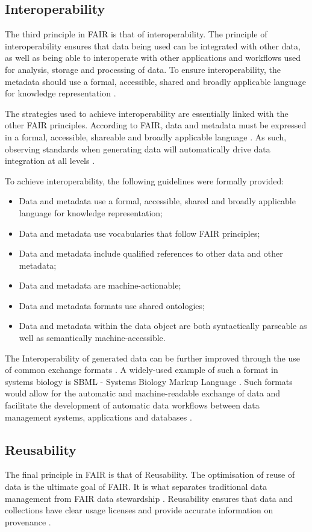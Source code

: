 \documentclass{cisfyp}
\begin{document}
\subsection{Interoperability}
The third principle in FAIR is that of interoperability. The principle of interoperability ensures that data being used can be integrated with other data, as well as being able to interoperate with other applications and workflows used for analysis, storage and processing of data. To ensure interoperability, the metadata should use a formal, accessible, shared and broadly applicable language for knowledge representation \cite{libereurope_2017}.

The strategies used to achieve interoperability are essentially linked with the other FAIR principles. According to FAIR, data and metadata must be expressed in a formal, accessible, shareable and broadly applicable language \cite{Wise2019}. As such, observing standards when generating data will automatically drive data integration at all levels \cite{Wise2019}.

To achieve interoperability, the following guidelines were formally provided: \cite{Wilkinson2016}
\begin{itemize}
	\item Data and metadata use a formal, accessible, shared and broadly applicable language for knowledge representation;
	\item Data and metadata use vocabularies that follow FAIR principles;
	\item Data and metadata include qualified references to other data and other metadata;
	\item Data and metadata are machine-actionable;
	\item Data and metadata formats use shared ontologies;
	\item Data and metadata within the data object are both syntactically parseable as well as semantically machine-accessible.
\end{itemize}

The Interoperability of generated data can be further improved through the use of common exchange formats \cite{Wittig2017}. A widely-used example of such a format in systems biology is SBML - Systems Biology Markup Language \cite{Hucka2003}. Such formats would allow for the automatic and machine-readable exchange of data and facilitate the development of automatic data workflows between data management systems, applications and databases \cite{Wittig2017}.\pagebreak

\subsection{Reusability}
The final principle in FAIR is that of Reusability. The optimisation of reuse of data is the ultimate goal of FAIR. It is what separates traditional data management from FAIR data stewardship \cite{Wise2019}. Reusability ensures that data and collections have clear usage licenses and provide accurate information on provenance \cite{libereurope_2017}.
\end{document}
